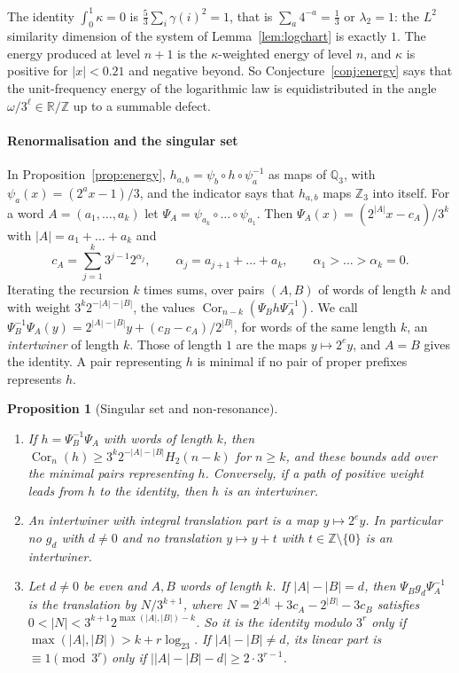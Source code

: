 \documentclass[12pt]{amsart}
\newtheorem{proposition}{Proposition}
\theoremstyle{definition}
\theoremstyle{remark}
\newcommand{\Z}{\mathbb{Z}}
\begin{document}
The identity $\int_0^1\kappa=0$ is $\frac53\sum_i\gamma(i)^2=1$, that is $\sum_a4^{-a}=\frac13$ or $\lambda_2=1$: the $L^2$ similarity dimension of the system of Lemma~\ref{lem:logchart} is exactly $1$. The energy produced at level $n+1$ is the $\kappa$-weighted energy of level $n$, and $\kappa$ is positive for $|x|<0.21$ and negative beyond. So Conjecture~\ref{conj:energy} says that the unit-frequency energy of the logarithmic law is equidistributed in the angle $\omega/3^\ell\in\mathbb R/\Z$ up to a summable defect.

\paragraph{Renormalisation and the singular set} In Proposition~\ref{prop:energy}, $h_{a,b}=\psi_b\circ h\circ\psi_a^{-1}$ as maps of $\mathbb Q_3$, with $\psi_a(x)=(2^ax-1)/3$, and the indicator says that $h_{a,b}$ maps $\Z_3$ into itself. For a word $A=(a_1,\dots,a_k)$ let $\Psi_A=\psi_{a_k}\circ\dots\circ\psi_{a_1}$. Then $\Psi_A(x)=(2^{|A|}x-c_A)/3^k$ with $|A|=a_1+\dots+a_k$ and
\[
 c_A=\sum_{j=1}^k3^{j-1}2^{\alpha_j},\qquad\alpha_j=a_{j+1}+\dots+a_k,\qquad\alpha_1>\dots>\alpha_k=0 .
\]
Iterating the recursion $k$ times sums, over pairs $(A,B)$ of words of length $k$ and with weight $3^k2^{-|A|-|B|}$, the values $\operatorname{Cor}_{n-k}(\Psi_Bh\Psi_A^{-1})$. We call $\Psi_B^{-1}\Psi_A(y)=2^{|A|-|B|}y+(c_B-c_A)/2^{|B|}$, for words of the same length $k$, an \emph{intertwiner} of length $k$. Those of length $1$ are the maps $y\mapsto2^ey$, and $A=B$ gives the identity. A pair representing $h$ is minimal if no pair of proper prefixes represents $h$.

\begin{proposition}[Singular set and non-resonance]
\label{prop:intertwiners}
\leavevmode\begin{enumerate}
\item[(a)] If $h=\Psi_B^{-1}\Psi_A$ with words of length $k$, then $\operatorname{Cor}_n(h)\ge3^k2^{-|A|-|B|}H_2(n-k)$ for $n\ge k$, and these bounds add over the minimal pairs representing $h$. Conversely, if a path of positive weight leads from $h$ to the identity, then $h$ is an intertwiner.
\item[(b)] An intertwiner with integral translation part is a map $y\mapsto2^ey$. In particular no $g_d$ with $d\ne0$ and no translation $y\mapsto y+t$ with $t\in\Z\setminus\{0\}$ is an intertwiner.
\item[(c)] Let $d\ne0$ be even and $A,B$ words of length $k$. If $|A|-|B|=d$, then $\Psi_Bg_d\Psi_A^{-1}$ is the translation by $N/3^{k+1}$, where $N=2^{|A|}+3c_A-2^{|B|}-3c_B$ satisfies $0<|N|<3^{k+1}2^{\max(|A|,|B|)-k}$. So it is the identity modulo $3^r$ only if $\max(|A|,|B|)>k+r\log_23$. If $|A|-|B|\ne d$, its linear part is $\equiv1\pmod{3^r}$ only if $\bigl||A|-|B|-d\bigr|\ge2\cdot3^{r-1}$.
\end{enumerate}
\end{proposition}
\end{document}
